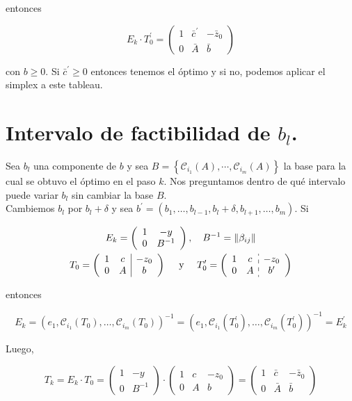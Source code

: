 \documentclass[10pt]{article}
\begin{document}
entonces

$$
E_{k} \cdot T_{0}^{\prime}=\left(\begin{array}{cc|c}
1 & \bar{c}^{\prime} & -\bar{z}_{0} \\
0 & \bar{A} & \bar{b}
\end{array}\right)
$$

con $b \geq 0$. Si $\bar{c}^{\prime} \geq 0$ entonces tenemos el óptimo y si no, podemos aplicar el simplex a este tableau.

\section*{Intervalo de factibilidad de $b_{l}$.}
Sea $b_{l}$ una componente de $b$ y sea $B=\left\{\mathcal{C}_{i_{1}}(A), \cdots, \mathcal{C}_{i_{m}}(A)\right\}$ la base para la cual se obtuvo el óptimo en el paso $k$. Nos preguntamos dentro de qué intervalo puede variar $b_{l}$ sin cambiar la base $B$.\\
Cambiemos $b_{l}$ por $b_{l}+\delta$ y sea $b^{\prime}=\left(b_{1}, \ldots, b_{l-1}, b_{l}+\delta, b_{l+1}, \ldots, b_{m}\right)$. Si

$$
\begin{gathered}
E_{k}=\left(\begin{array}{cc}
1 & -y \\
0 & B^{-1}
\end{array}\right), \quad B^{-1}=\left\|\beta_{i j}\right\| \\
T_{0}=\left(\begin{array}{cc|c}
1 & c & -z_{0} \\
0 & A & b
\end{array}\right) \quad \text { y } \quad T_{0}^{\prime}=\left(\begin{array}{cc:c}
1 & c & -z_{0} \\
0 & A & b^{\prime}
\end{array}\right)
\end{gathered}
$$

entonces

$$
E_{k}=\left(e_{1}, \mathcal{C}_{i_{1}}\left(T_{0}\right), \ldots, \mathcal{C}_{i_{m}}\left(T_{0}\right)\right)^{-1}=\left(e_{1}, \mathcal{C}_{i_{1}}\left(T_{0}^{\prime}\right), \ldots, \mathcal{C}_{i_{m}}\left(T_{0}^{\prime}\right)\right)^{-1}=E_{k}^{\prime}
$$

Luego,

$$
T_{k}=E_{k} \cdot T_{0}=\left(\begin{array}{cc}
1 & -y \\
0 & B^{-1}
\end{array}\right) \cdot\left(\begin{array}{cc|c}
1 & c & -z_{0} \\
0 & A & b
\end{array}\right)=\left(\begin{array}{cc|c}
1 & \bar{c} & -\bar{z}_{0} \\
0 & \bar{A} & \bar{b}
\end{array}\right)
$$
\end{document}
